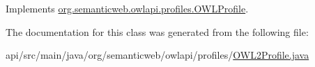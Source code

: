 Implements \hyperlink{interfaceorg_1_1semanticweb_1_1owlapi_1_1profiles_1_1_o_w_l_profile_a5dd9baeaba4c9170b2df1d037bc45ab9}{org.\-semanticweb.\-owlapi.\-profiles.\-O\-W\-L\-Profile}.



The documentation for this class was generated from the following file\-:\begin{DoxyCompactItemize}
\item 
api/src/main/java/org/semanticweb/owlapi/profiles/\hyperlink{_o_w_l2_profile_8java}{O\-W\-L2\-Profile.\-java}\end{DoxyCompactItemize}
